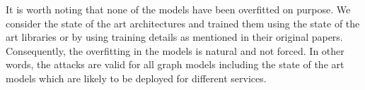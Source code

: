 It is worth noting that none of the models have been overfitted on purpose. 
We consider the state of the art architectures and trained them using the state of the art libraries or by using training details as mentioned in their original papers. 
Consequently, the overfitting in the models is natural and not forced. 
In other words, the attacks are valid for all graph models including the state of the art models which are likely to be deployed for different services.




























